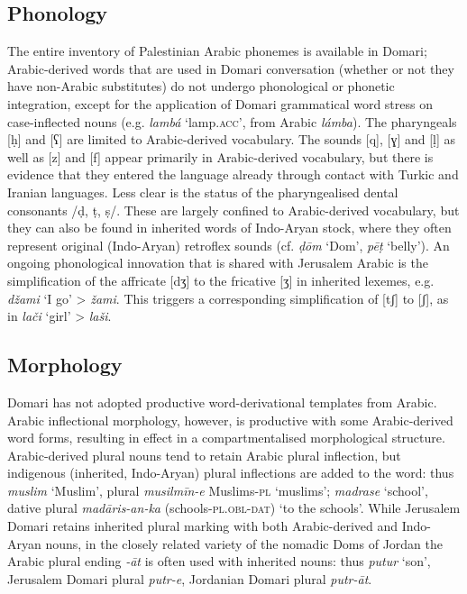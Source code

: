 \documentclass[output=paper]{langsci/langscibook}
\begin{document}
\subsection{Phonology
}

The entire inventory of Palestinian Arabic phonemes is available in Domari; Arabic-derived words that are used in Domari conversation (whether or not they have non-Arabic substitutes) do not undergo phonological or phonetic integration, except for the application of Domari grammatical word stress on case-inflected nouns (e.g. \textit{lambá} ‘lamp.\textsc{acc}’, from Arabic \textit{lámba}). The pharyngeals [ḥ] and [{ʕ}] are limited to Arabic-derived vocabulary. The sounds [q], [{ɣ}] and [ḷ] as well as [z] and [f] appear primarily in Arabic-derived vocabulary, but there is evidence that they entered the language already through contact with Turkic and Iranian languages. Less clear is the status of the pharyngealised dental consonants /ḍ, ṭ, ṣ/. These are largely confined to Arabic-derived vocabulary, but they can also be found in inherited words of Indo-Aryan stock, where they often represent original (Indo-Aryan) retroflex sounds (cf. \textit{ḍōm} ‘Dom’, \textit{pēṭ} ‘belly’). An ongoing phonological innovation that is shared with Jerusalem Arabic is the simplification of the affricate [{dʒ}] to the fricative [{ʒ}] in inherited lexemes, e.g. \textit{džami} ‘I go’ > \textit{žami}. This triggers a corresponding simplification of [{tʃ}] to [{ʃ}], as in \textit{lači} ‘girl’ > \textit{laši}. 

\subsection{Morphology
}

Domari has not adopted productive word-derivational templates from Arabic. Arabic inflectional morphology, however, is productive with some Arabic-derived word forms, resulting in effect in a compartmentalised morphological structure. Arabic-derived plural nouns tend to retain Arabic plural inflection, but indigenous (inherited, Indo-Aryan) plural inflections are added to the word: thus \textit{muslim} ‘Muslim’, plural \textit{musilmīn-e} Muslims-\textsc{pl} \textsc{‘}muslims’; \textit{madrase} ‘school’, dative plural \textit{madāris-an-ka}  (schools-\textsc{pl.obl-dat}) ‘to the schools’. While Jerusalem Domari retains inherited plural marking with both Arabic-derived and Indo-Aryan nouns, in the closely related variety of the nomadic Doms of Jordan the Arabic plural ending \textit{-āt} is often used with inherited nouns: thus \textit{putur} ‘son’, Jerusalem Domari plural \textit{putr-e}, Jordanian Domari plural \textit{putr-āt}.
\end{document}
